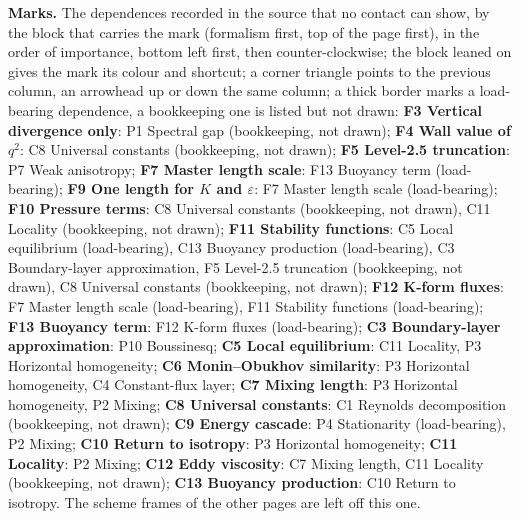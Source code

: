 \documentclass[10pt]{article}
\newcommand{\qsq}{q^{2}}
\begin{document}
\vspace{0.2ex}
{\footnotesize\textbf{Marks.} The dependences recorded in the source that no contact can show, by the block that carries the mark (formalism first, top of the page first), in the order of importance, bottom left first, then counter-clockwise; the block leaned on gives the mark its colour and shortcut; a corner triangle points to the previous column, an arrowhead up or down the same column; a thick border marks a load-bearing dependence, a bookkeeping one is listed but not drawn: \textbf{F3 Vertical divergence only}: P1 Spectral gap (bookkeeping, not drawn); \textbf{F4 Wall value of $\qsq$}: C8 Universal constants (bookkeeping, not drawn); \textbf{F5 Level-2.5 truncation}: P7 Weak anisotropy; \textbf{F7 Master length scale}: F13 Buoyancy term (load-bearing); \textbf{F9 One length for $K$ and $\varepsilon$}: F7 Master length scale (load-bearing); \textbf{F10 Pressure terms}: C8 Universal constants (bookkeeping, not drawn), C11 Locality (bookkeeping, not drawn); \textbf{F11 Stability functions}: C5 Local equilibrium (load-bearing), C13 Buoyancy production (load-bearing), C3 Boundary-layer approximation, F5 Level-2.5 truncation (bookkeeping, not drawn), C8 Universal constants (bookkeeping, not drawn); \textbf{F12 K-form fluxes}: F7 Master length scale (load-bearing), F11 Stability functions (load-bearing); \textbf{F13 Buoyancy term}: F12 K-form fluxes (load-bearing); \textbf{C3 Boundary-layer approximation}: P10 Boussinesq; \textbf{C5 Local equilibrium}: C11 Locality, P3 Horizontal homogeneity; \textbf{C6 Monin--Obukhov similarity}: P3 Horizontal homogeneity, C4 Constant-flux layer; \textbf{C7 Mixing length}: P3 Horizontal homogeneity, P2 Mixing; \textbf{C8 Universal constants}: C1 Reynolds decomposition (bookkeeping, not drawn); \textbf{C9 Energy cascade}: P4 Stationarity (load-bearing), P2 Mixing; \textbf{C10 Return to isotropy}: P3 Horizontal homogeneity; \textbf{C11 Locality}: P2 Mixing; \textbf{C12 Eddy viscosity}: C7 Mixing length, C11 Locality (bookkeeping, not drawn); \textbf{C13 Buoyancy production}: C10 Return to isotropy. The scheme frames of the other pages are left off this one.\par}
\end{document}
